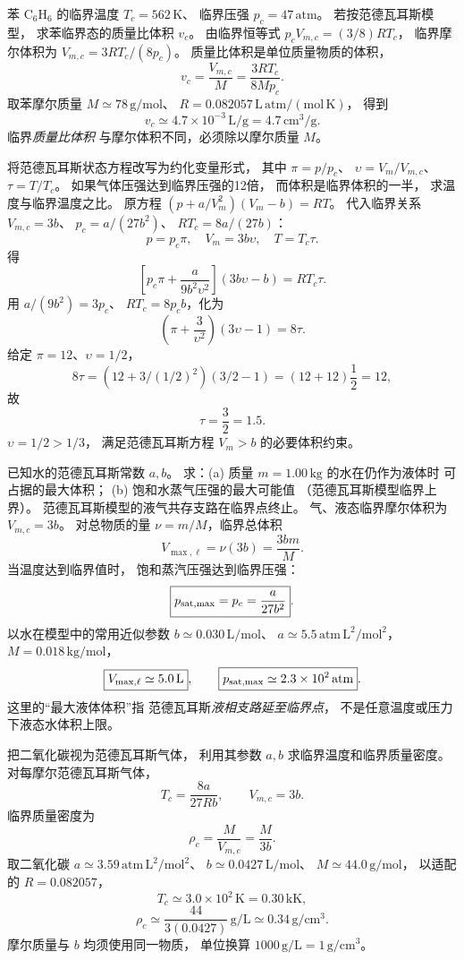 苯 $\mathrm{C_6H_6}$ 的临界温度
$T_c=562\,\mathrm K$、
临界压强 $p_c=47\,\mathrm{atm}$。
若按范德瓦耳斯模型，
求苯临界态的质量比体积 $v_c$。
\exsolution
由临界恒等式
$p_cV_{m,c}=(3/8)RT_c$，
临界摩尔体积为
$V_{m,c}=3RT_c/(8p_c)$。
质量比体积是单位质量物质的体积，
\[
v_c=\frac{V_{m,c}}M
=\boxed{\frac{3RT_c}{8Mp_c}}.
\]
取苯摩尔质量
$M\simeq78\,\mathrm{g/mol}$、
$R=0.082057\,\mathrm{L\,atm/(mol\,K)}$，
得到
\[
\boxed{v_c\simeq4.7\times10^{-3}\,\mathrm{L/g}
=4.7\,\mathrm{cm^3/g}}.
\]
\excheck 临界\emph{质量比体积}
与摩尔体积不同，必须除以摩尔质量 $M$。

将范德瓦耳斯状态方程改写为约化变量形式，
其中
$\pi=p/p_c$、
$\upsilon=V_m/V_{m,c}$、
$\tau=T/T_c$。
如果气体压强达到临界压强的12倍，
而体积是临界体积的一半，
求温度与临界温度之比。
\exsolution
原方程
$(p+a/V_m^2)(V_m-b)=RT$。
代入临界关系
$V_{m,c}=3b$、
$p_c=a/(27b^2)$、
$RT_c=8a/(27b)$：
\[
p=p_c\pi,\quad V_m=3b\upsilon,\quad T=T_c\tau.
\]
得
\[
\left[p_c\pi+\frac a{9b^2\upsilon^2}\right]
(3b\upsilon-b)=RT_c\tau.
\]
用 $a/(9b^2)=3p_c$、
$RT_c=8p_cb$，化为
\[
\boxed{\left(\pi+\frac3{\upsilon^2}\right)
(3\upsilon-1)=8\tau}.
\]
给定 $\pi=12$、$\upsilon=1/2$，
\[
8\tau=(12+3/(1/2)^2)(3/2-1)
=(12+12)\frac12=12,
\]
故
\[
\boxed{\tau=\frac32=1.5}.
\]
\excheck $\upsilon=1/2>1/3$，
满足范德瓦耳斯方程 $V_m>b$ 的必要体积约束。

已知水的范德瓦耳斯常数 $a,b$。
求：(a) 质量
$m=1.00\,\mathrm{kg}$ 的水在仍作为液体时
可占据的最大体积；
(b) 饱和水蒸气压强的最大可能值
（范德瓦耳斯模型临界上界）。
\exsolution
范德瓦耳斯模型的液气共存支路在临界点终止。
气、液态临界摩尔体积为
$V_{m,c}=3b$。
对总物质的量
$\nu=m/M$，临界总体积
\[
\boxed{V_{\max,\ell}=\nu(3b)=\frac{3bm}{M}}.
\]
当温度达到临界值时，
饱和蒸汽压强达到临界压强：
\[
\boxed{p_{\rm sat,max}=p_c=\frac a{27b^2}}.
\]
以水在模型中的常用近似参数
$b\simeq0.030\,\mathrm{L/mol}$、
$a\simeq5.5\,\mathrm{atm\,L^2/mol^2}$，
$M=0.018\,\mathrm{kg/mol}$，
\[
\boxed{V_{\max,\ell}\simeq5.0\,\mathrm L},\qquad
\boxed{p_{\rm sat,max}\simeq2.3\times10^2\,\mathrm{atm}}.
\]
\excheck 这里的“最大液体体积”指
范德瓦耳斯\emph{液相支路延至临界点}，
不是任意温度或压力下液态水体积上限。

把二氧化碳视为范德瓦耳斯气体，
利用其参数 $a,b$ 求临界温度和临界质量密度。
\exsolution
对每摩尔范德瓦耳斯气体，
\[
T_c=\frac{8a}{27Rb},\qquad V_{m,c}=3b.
\]
临界质量密度为
\[
\boxed{\rho_c=\frac M{V_{m,c}}=\frac M{3b}}.
\]
取二氧化碳
$a\simeq3.59\,\mathrm{atm\,L^2/mol^2}$、
$b\simeq0.0427\,\mathrm{L/mol}$、
$M\simeq44.0\,\mathrm{g/mol}$，
以适配的 $R=0.082057$，
\[
\boxed{T_c\simeq3.0\times10^2\,\mathrm K
=0.30\,\mathrm{kK}},
\]
\[
\boxed{\rho_c\simeq\frac{44}{3(0.0427)}
\,\mathrm{g/L}\simeq0.34\,\mathrm{g/cm^3}}.
\]
\excheck 摩尔质量与 $b$ 均须使用同一物质，
单位换算
$1000\,\mathrm{g/L}=1\,\mathrm{g/cm^3}$。

